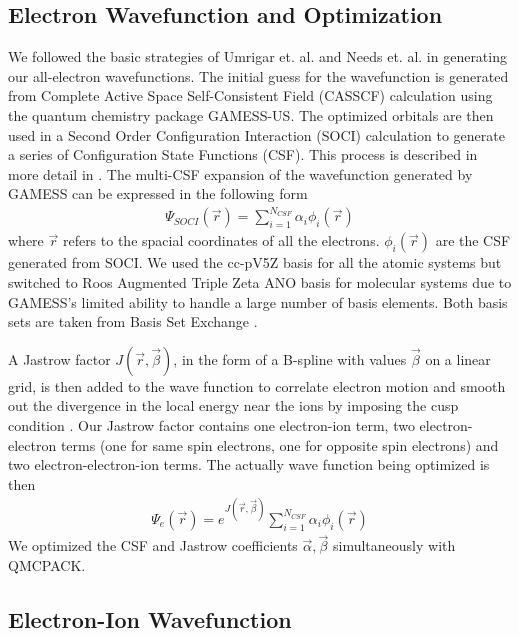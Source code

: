 \documentclass[aps,prl,superscriptaddress,groupedaddress]{revtex4}
\begin{document}
\subsection{Electron Wavefunction and Optimization}
We followed the basic strategies of Umrigar et. al.\cite{Umrigar_Alleviation,Toulouse_Bench} and Needs et. al. \cite{Brown_Bench,Seth_Bench} in generating our all-electron wavefunctions. The initial guess for the wavefunction is generated from Complete Active Space Self-Consistent Field (CASSCF) \cite{Chaban_MCSCF,Szabo} calculation using the quantum chemistry package GAMESS-US\cite{GAMESS}. The optimized orbitals are then used in a Second Order Configuration Interaction (SOCI) calculation to generate a series of Configuration State Functions (CSF). This process is described in more detail in \cite{Clark_Bench}. The multi-CSF expansion of the wavefunction generated by GAMESS can be expressed in the following form
\begin{align}
\Psi_{SOCI}(\vec{r})=\sum\limits_{i=1}^{N_{CSF}}\alpha_i\phi_i(\vec{r}) \label{eq:psi_gms}
\end{align}
where $\vec{r}$ refers to the spacial coordinates of all the electrons. $\phi_i(\vec{r})$ are the CSF generated from SOCI. We used the cc-pV5Z basis for all the atomic systems but switched to Roos Augmented Triple Zeta ANO basis for molecular systems due to GAMESS's limited ability to handle a large number of basis elements. Both basis sets are taken from Basis Set Exchange \cite{BSE}.

A Jastrow factor $J(\vec{r},\vec{\beta})$, in the form of a B-spline with values $\vec{\beta}$ on a linear grid, is then added to the wave function to correlate electron motion and smooth out the divergence in the local energy near the ions by imposing the cusp condition \cite{Kato}. Our Jastrow factor contains one electron-ion term, two electron-electron terms (one for same spin electrons, one for opposite spin electrons) and two electron-electron-ion terms. The actually wave function being optimized is then
\begin{align}
\Psi_e(\vec{r})=e^{J(\vec{r},\vec{\beta})}\sum\limits_{i=1}^{N_{CSF}}\alpha_i\phi_i(\vec{r})\label{eq:psie}
\end{align}
We optimized the CSF and Jastrow coefficients $\vec{\alpha},\vec{\beta}$ simultaneously with QMCPACK\cite{QMCPACK}.

\subsection{Electron-Ion Wavefunction}
\end{document}
